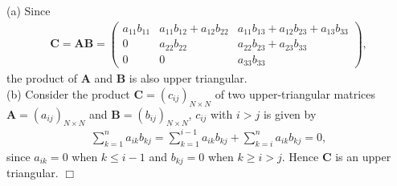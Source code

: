 \documentclass[UTF8,12pt,hyperref]{ctexart}
\newenvironment{solve}[1][\color{blue}\bf Solve]{\begin{trivlist}
\item[\hskip \labelsep {\color{blue}\bfseries
#1}]}{\hfill$\Box$\end{trivlist}}
\begin{document}
\begin{solve}
  (a) Since
  \begin{align*}
    \boldsymbol{C}=\boldsymbol{AB}=
    \begin{pmatrix}
      a_{11}b_{11}& a_{11}b_{12}+a_{12}b_{22}  & a_{11}b_{13}+a_{12}b_{23}+a_{13}b_{33} \\
      0&  a_{22}b_{22}& a_{22}b_{23}+a_{23}b_{33} \\
      0&  0& a_{33}b_{33}
    \end{pmatrix},
  \end{align*}
  the product of $\boldsymbol{A}$ and $\boldsymbol{B}$ is also upper triangular.
  \\
  (b) Consider the product $\boldsymbol{C}=(c_{ij})_{N\times N}$ of two upper-triangular matrices $\boldsymbol{A}=(a_{ij})_{N\times N}$ and
  $\boldsymbol{B}=(b_{ij})_{N\times N}$, $c_{ij}$ with $i>j$ is given by
  \begin{align*}
     \sum\limits_{k=1}^{n} a_{ik}b_{kj}=\sum\limits_{k=1}^{i-1}a_{ik}b_{kj} + \sum\limits_{k=i}^{n}a_{ik}b_{kj}=0,
  \end{align*}
  since $a_{ik}=0$ when $k\leqslant i-1$ and $b_{kj}=0$ when $k\geqslant i>j$.
  Hence $\boldsymbol{C}$ is an upper triangular.
\end{solve} 
\end{document}
